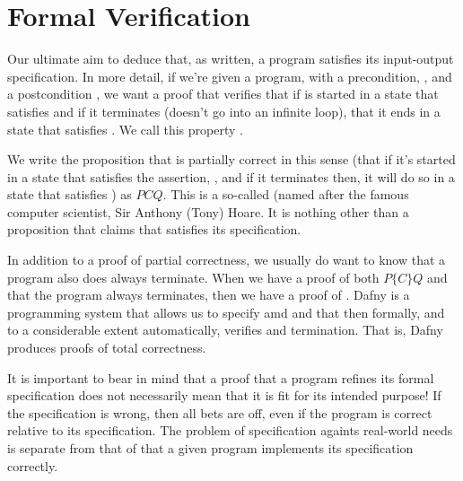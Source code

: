 \documentclass[letterpaper,10pt,english]{sphinxmanual}
\begin{document}
\section{Formal Verification}
\label{\detokenize{05-putting-it-together:formal-verification}}
Our ultimate aim to deduce that, as written, a program satisfies its
input-output specification.  In more detail, if we’re given a program,
 with a precondition, , and a postcondition , we want a proof
that verifies that if  is started in a state that satisfies  and
if it terminates (doesn’t go into an infinite loop), that it ends in a
state that satisfies . We call this property .

We write the proposition that  is partially correct in this sense
(that if it’s started in a state that satisfies the assertion, ,
and if it terminates then, it will do so in a state that satisfies
) as \(P {C} Q.\) This is a so-called  (named
after the famous computer scientist, Sir Anthony (Tony) Hoare. It is
nothing other than a proposition that claims that  satisfies its
specification.

In addition to a proof of partial correctness, we usually do want to
know that a program also does always terminate. When we have a proof
of both \(P \{C\} Q\) and that the program always terminates, then
we have a proof of . Dafny is a programming system
that allows us to specify  amd  and that then formally, and to a
considerable extent automatically, verifies  and termination.
That is, Dafny produces proofs of total correctness.

It is important to bear in mind that a proof that a program refines
its formal specification does not necessarily mean that it is fit for
its intended purpose! If the specification is wrong, then all bets are
off, even if the program is correct relative to its specification.
The problem of  specification againts real-world needs is
separate from that of  that a given program implements its
specification correctly.
\end{document}
